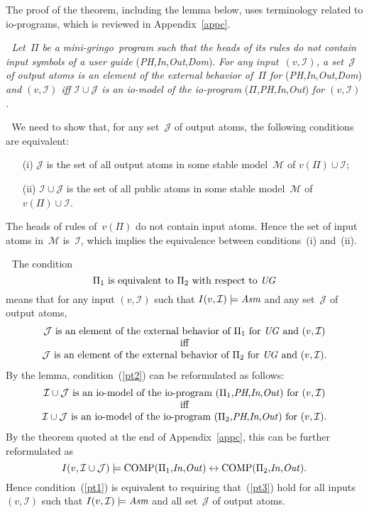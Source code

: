 \documentclass{article}
\def\lrar{\leftrightarrow}
\def\beq{\begin{equation}}
\def\eeq#1{\label{#1}\end{equation}}
\def\ba{\begin{array}}
\def\ea{\end{array}}
\def\gringo{{\sc gringo}}
\newcommand{\I}{\mathcal{I}}
\newcommand{\J}{\mathcal{J}}
\newcommand{\M}{\mathcal{M}}
\begin{document}
The proof of the theorem, including the lemma below, uses
terminology related to io-programs, which
is reviewed in Appendix~\ref{appc}.

\medskip{}$\;$\emph{
Let~$\Pi$ be a mini-\gringo\ program such that the heads of its rules do not
contain input symbols of a user guide}
(\emph{PH},\emph{In},\emph{Out},\emph{Dom\/}). \emph{For any
  input~$(v,\I)$, a set~$\J$ of
  output atoms is an element of the external behavior
  of~$\Pi$ for} (\emph{PH},\emph{In},\emph{Out},\emph{Dom\/})
\emph{and $(v,\I)$ iff
$\I\cup\J$ is an io-model of the io-program}
($\Pi$,\emph{PH},\emph{In},\emph{Out}) \emph{for $(v,\I)$.}

\medskip{}$\;$
We need to show that, for any set~$\J$ of output atoms, the following
conditions are equivalent:
\begin{itemize}
\item[(i)] $\J$ is the set of all output atoms in some stable model~$\M$ 
  of $v(\Pi)\cup\I$;
\item[(ii)] $\I\cup\J$ is the set of all public atoms in some stable
  model~$\M$ of $v(\Pi)\cup\I$.
\end{itemize}
The heads of rules of~$v(\Pi)$ do not contain input atoms.  Hence
the set of input atoms in~$\M$ is~$\I$, which implies the equivalence
between conditions~(i) and~(ii).

\medskip{}$\;$
The condition
\beq
\Pi_1\hbox{ is equivalent to }\Pi_2\hbox{ with respect to }\emph{UG}
\eeq{pt1}
means that for any input $(v,\I)$ such that $I(v,\I)\models\emph{Asm}$
and any set~$\J$ of output atoms,
\beq\ba c
\J\hbox{ is an element of the external behavior
  of~$\Pi_1$ for \emph{UG} and }(v,\I)\\
\hbox{iff}\\
\J\hbox{ is an element of the external behavior
  of~$\Pi_2$ for \emph{UG} and }(v,\I).
\ea\eeq{pt2}
By the lemma, condition~(\ref{pt2}) can be reformulated as follows:
$$\ba c
\I\cup\J\hbox{ is an io-model of the io-program
($\Pi_1$,\emph{PH},\emph{In},\emph{Out}) for }(v,\I)\\
\hbox{iff}\\
\I\cup\J\hbox{ is an io-model of the io-program
($\Pi_2$,\emph{PH},\emph{In},\emph{Out}) for }(v,\I).\\
\ea$$
By the theorem quoted at the end of Appendix~\ref{appc}, this can be further
reformulated as
\beq I(v,\I\cup\J) \models
\hbox{COMP($\Pi_1$,\emph{In\/},\emph{Out\/})}
\lrar
\hbox{COMP($\Pi_2$,\emph{In\/},\emph{Out\/})}.
\eeq{pt3}
Hence condition~(\ref{pt1}) is equivalent to requiring that~(\ref{pt3})
hold for all inputs $(v,\I)$ such that
$I(v,\I)\models\emph{Asm}$ and all set~$\J$ of output atoms.
\end{document}
